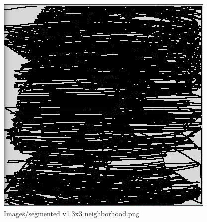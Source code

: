 \begin{figure}[H]
\includegraphics[width=\textwidth]{Images/segmented_v1_3x3_neighborhood.png}
\caption{Images/segmented v1 3x3 neighborhood.png}
\label{fig:Images/segmented v1 3x3 neighborhood.png}
\end{figure}
